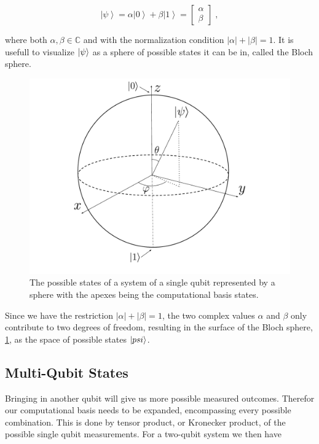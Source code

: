 $$\left | \psi \right > = \alpha \left | 0 \right > + \beta \left | 1 \right > = \begin{bmatrix}
    \alpha \\ \beta
\end{bmatrix}\; ,$$

where both $\alpha, \beta \in \mathbb{C}$ and with the normalization condition $\lvert\alpha\rvert + \lvert\beta\rvert = 1$. It is usefull to visualize $\ket{\psi}$ as a sphere of possible states it can be in, called the Bloch sphere.

\begin{figure}[H]
    \centering
    \includegraphics[width=\textwidth]{Figures/Drawn/bloch pshere.pdf}
    \caption{The possible states of a system of a single qubit represented by a sphere with the apexes being the computational basis states.}
    \label{fig:blochsphere}
\end{figure}

Since we have the restriction $\lvert\alpha\rvert + \lvert\beta\rvert = 1$, the two complex values $\alpha$ and $\beta$ only contribute to two degrees of freedom, resulting in the surface of the Bloch sphere, \ref{fig:blochsphere}, as the space of possible states $\ket{psi}$.

\subsection{Multi-Qubit States}

Bringing in another qubit will give us more possible measured outcomes. Therefor our computational basis needs to be expanded, encompassing every possible combination. This is done by tensor product, or Kronecker product, of the possible single qubit measurements. For a two-qubit system we then have

